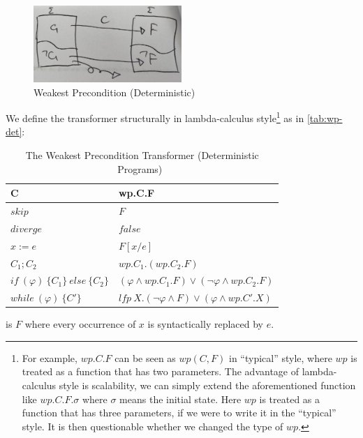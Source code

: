 \begin{figure}[ht!]\centering
\includegraphics[width=0.5\textwidth]{image/wp-det.jpg}
\caption{Weakest Precondition (Deterministic)}
\label{fig:wp-det}
\end{figure}

We define the  transformer structurally in lambda-calculus style\footnote{For example, $wp.C.F$ can be seen as $wp(C,F)$ in ``typical'' style, where $wp$ is treated as a function that has two parameters. The advantage of lambda-calculus style is scalability, we can simply extend the aforementioned function like $wp.C.F.\sigma$ where $\sigma$ means the initial state. Here $wp$ is treated as a function that has three parameters, if we were to write it in the ``typical'' style. It is then questionable whether we changed the type of $wp$. } as in \autoref{tab:wp-det}: 

\begin{table}[ht!]\centering
    \begin{tabular}{ll}
    \hline\hline
      \textbf{C}&\textbf{wp.C.F}    \\ \hline
      $skip$&   $F$   \\
      $diverge$&  $false$\\
      $x:= e $&  $F[x/e]$\\
      $C_1;C_2$&  $wp.C_1.(wp.C_2.F)$\\
      $if\ (\varphi)\ \{C_1\}\ else\ \{C_2\} $&  $(\varphi\wedge wp.C_1.F)\vee(\neg\varphi\wedge wp.C_2.F)$\\
      $while\ (\varphi)\ \{C'\}$&  $lfp\ X.(\neg\varphi\wedge F)\vee(\varphi\wedge wp.C'.X)$\\
    \hline\hline
    \end{tabular}
    \caption{The Weakest Precondition Transformer (Deterministic Programs)~\cite{kaminski19}}
    \label{tab:wp-det}
\end{table}

 is $F$ where every occurrence of $x$ is syntactically replaced by $e$. 

